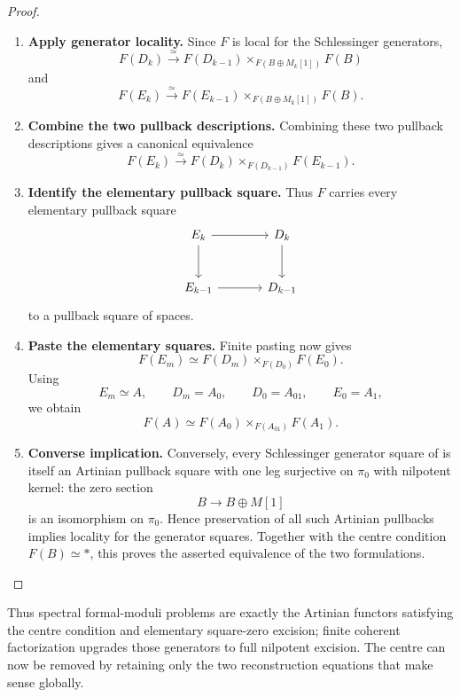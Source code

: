 \begin{proof}
\begin{enumerate}[label=\textup{(\arabic*)}]
    \item \textbf{Apply generator locality.}
    Since \(F\) is local for the Schlessinger generators,
    \[
        F(D_k)
        \xrightarrow{\simeq}
        F(D_{k-1})
        \times_{F(B\oplus M_k[1])}
        F(B)
    \]
    and
    \[
        F(E_k)
        \xrightarrow{\simeq}
        F(E_{k-1})
        \times_{F(B\oplus M_k[1])}
        F(B).
    \]
    \item \textbf{Combine the two pullback descriptions.}
    Combining these two pullback descriptions gives a canonical equivalence
    \[
        F(E_k)
        \xrightarrow{\simeq}
        F(D_k)
        \times_{F(D_{k-1})}
        F(E_{k-1}).
    \]
    \item \textbf{Identify the elementary pullback square.}
    Thus \(F\) carries every elementary pullback square
    \[
    \begin{tikzcd}[column sep=large,row sep=large]
        E_k \arrow[r] \arrow[d]
            & D_k \arrow[d]
        \\
        E_{k-1} \arrow[r]
            & D_{k-1}
    \end{tikzcd}
    \]
    to a pullback square of spaces.
    \item \textbf{Paste the elementary squares.}
    Finite pasting now gives
    \[
        F(E_m)
        \simeq
        F(D_m)
        \times_{F(D_0)}
        F(E_0).
    \]
    Using
    \[
        E_m\simeq A,
        \qquad
        D_m=A_0,
        \qquad
        D_0=A_{01},
        \qquad
        E_0=A_1,
    \]
    we obtain
    \[
        F(A)
        \simeq
        F(A_0)
        \times_{F(A_{01})}
        F(A_1).
    \]
    \item \textbf{Converse implication.}
    Conversely, every Schlessinger generator square of
     is itself an Artinian pullback
    square with one leg surjective on \(\pi_0\) with nilpotent kernel: the zero section
    \[
        B\longrightarrow B\oplus M[1]
    \]
    is an isomorphism on \(\pi_0\). Hence preservation of all such Artinian
    pullbacks implies locality for the generator squares. Together with
    the centre condition \(F(B)\simeq *\), this proves the asserted equivalence of
    the two formulations.
\end{enumerate}
\end{proof}



Thus spectral formal-moduli problems are exactly the Artinian functors satisfying the
centre condition and elementary square-zero excision; finite coherent factorization
upgrades those generators to full nilpotent excision. The centre can now be removed by
retaining only the two reconstruction equations that make sense globally.

